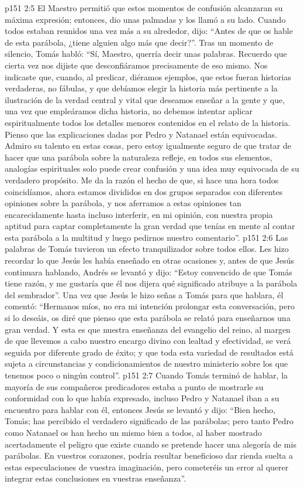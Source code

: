 \vs p151 2:5 El Maestro permitió que estos momentos de confusión alcanzaran su máxima expresión; entonces, dio unas palmadas y los llamó a su lado. Cuando todos estaban reunidos una vez más a su alrededor, dijo: “Antes de que os hable de esta parábola, ¿tiene alguien algo más que decir?”. Tras un momento de silencio, Tomás habló: “Sí, Maestro, querría decir unas palabras. Recuerdo que cierta vez nos dijiste que desconfiáramos precisamente de eso mismo. Nos indicaste que, cuando, al predicar, diéramos ejemplos, que estos fueran historias verdaderas, no fábulas, y que debíamos elegir la historia más pertinente a la ilustración de la verdad central y vital que deseamos enseñar a la gente y que, una vez que empleáramos dicha historia, no debemos intentar aplicar espiritualmente todos los detalles menores contenidos en el relato de la historia. Pienso que las explicaciones dadas por Pedro y Natanael están equivocadas. Admiro su talento en estas cosas, pero estoy igualmente seguro de que tratar de hacer que una parábola sobre la naturaleza refleje, en todos sus elementos, analogías espirituales solo puede crear confusión y una idea muy equivocada de su verdadero propósito. Me da la razón el hecho de que, si hace una hora todos coincidíamos, ahora estamos divididos en dos grupos separados con diferentes opiniones sobre la parábola, y nos aferramos a estas opiniones tan encarecidamente hasta incluso interferir, en mi opinión, con nuestra propia aptitud para captar completamente la gran verdad que tenías en mente al contar esta parábola a la multitud y luego pedirnos nuestro comentario”.
\vs p151 2:6 Las palabras de Tomás tuvieron un efecto tranquilizador sobre todos ellos. Les hizo recordar lo que Jesús les había enseñado en otras ocasiones y, antes de que Jesús continuara hablando, Andrés se levantó y dijo: “Estoy convencido de que Tomás tiene razón, y me gustaría que él nos dijera qué significado atribuye a la parábola del sembrador”. Una vez que Jesús le hizo señas a Tomás para que hablara, él comentó: “Hermanos míos, no era mi intención prolongar esta conversación, pero si lo deseáis, os diré que pienso que esta parábola se relató para enseñarnos una gran verdad. Y esta es que nuestra enseñanza del evangelio del reino, al margen de que llevemos a cabo nuestro encargo divino con lealtad y efectividad, se verá seguida por diferente grado de éxito; y que toda esta variedad de resultados está sujeta a circunstancias y condicionamientos de nuestro ministerio sobre los que tenemos poco o ningún control”.
\vs p151 2:7 Cuando Tomás terminó de hablar, la mayoría de sus compañeros predicadores estaba a punto de mostrarle su conformidad con lo que había expresado, incluso Pedro y Natanael iban a su encuentro para hablar con él, entonces Jesús se levantó y dijo: “Bien hecho, Tomás; has percibido el verdadero significado de las parábolas; pero tanto Pedro como Natanael os han hecho un mismo bien a todos, al haber mostrado acertadamente el peligro que existe cuando se pretende hacer una alegoría de mis parábolas. En vuestros corazones, podría resultar beneficioso dar rienda suelta a estas especulaciones de vuestra imaginación, pero cometeréis un error al querer integrar estas conclusiones en vuestras enseñanza”.
